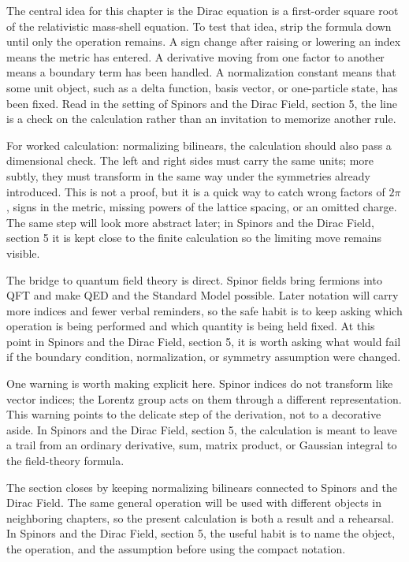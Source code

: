 The central idea for this chapter is the Dirac equation is a first-order square root of the relativistic mass-shell equation.  To test that idea, strip the formula down until only the operation remains.  A sign change after raising or lowering an index means the metric has entered.  A derivative moving from one factor to another means a boundary term has been handled.  A normalization constant means that some unit object, such as a delta function, basis vector, or one-particle state, has been fixed.  Read in the setting of Spinors and the Dirac Field, section 5, the line is a check on the calculation rather than an invitation to memorize another rule.

For worked calculation: normalizing bilinears, the calculation should also pass a dimensional check.  The left and right sides must carry the same units; more subtly, they must transform in the same way under the symmetries already introduced.  This is not a proof, but it is a quick way to catch wrong factors of \(2\pi\), signs in the metric, missing powers of the lattice spacing, or an omitted charge.  The same step will look more abstract later; in Spinors and the Dirac Field, section 5 it is kept close to the finite calculation so the limiting move remains visible.

The bridge to quantum field theory is direct.  Spinor fields bring fermions into QFT and make QED and the Standard Model possible.  Later notation will carry more indices and fewer verbal reminders, so the safe habit is to keep asking which operation is being performed and which quantity is being held fixed.  At this point in Spinors and the Dirac Field, section 5, it is worth asking what would fail if the boundary condition, normalization, or symmetry assumption were changed.

One warning is worth making explicit here.  Spinor indices do not transform like vector indices; the Lorentz group acts on them through a different representation.  This warning points to the delicate step of the derivation, not to a decorative aside.  In Spinors and the Dirac Field, section 5, the calculation is meant to leave a trail from an ordinary derivative, sum, matrix product, or Gaussian integral to the field-theory formula.

The section closes by keeping normalizing bilinears connected to Spinors and the Dirac Field.  The same general operation will be used with different objects in neighboring chapters, so the present calculation is both a result and a rehearsal.  In Spinors and the Dirac Field, section 5, the useful habit is to name the object, the operation, and the assumption before using the compact notation.



